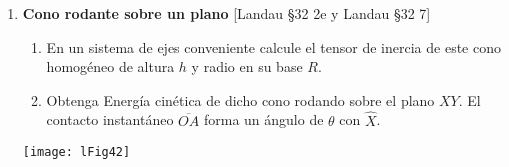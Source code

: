 \documentclass[11pt, spanish, a4paper, twoside]{article}
\begin{document}
\begin{enumerate}
	\item 
		\begin{minipage}[t][3.5cm]{0.5\textwidth}
			\textbf{Cono rodante sobre un plano} [Landau \S 32 2e y Landau \S 32 7]\\
			\begin{enumerate}
				\item En un sistema de ejes conveniente calcule el tensor de inercia de este cono homogéneo de altura \(h\) y radio en su base \(R\).
				\item Obtenga Energía cinética de dicho cono rodando sobre el plano \(X Y\).
					El contacto instantáneo \(\overline{O A}\) forma un ángulo de \(\theta\) con \(\hat{X}\).
			\end{enumerate}
		\end{minipage}
		\begin{minipage}[c][1cm][t]{0.45\textwidth}
			\texttt{[image: lFig42]}
		\end{minipage}


\end{enumerate}
\end{document}
